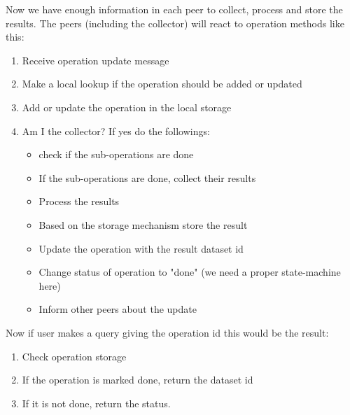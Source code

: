 Now we have enough information in each peer to collect, process and store the results. The peers (including the collector)
 will react to operation methods like this:

\begin{enumerate}
\item Receive operation update message
\item Make a local lookup if the operation should be added or updated
\item Add or update the operation in the local storage
\item Am I the collector? If yes do the followings:
\begin{itemize}
\item check if the sub-operations are done
\item If the sub-operations are done, collect their results
\item Process the results
\item Based on the storage mechanism store the result
\item Update the operation with the result dataset id
\item Change status of operation to "done" (we need a proper state-machine here)
\item Inform other peers about the update
\end{itemize}
\end{enumerate}

Now if user makes a query giving the operation id this would be the result:

\begin{enumerate}
\item Check operation storage
\item If the operation is marked done, return the dataset id
\item If it is not done, return the status.
\end{enumerate}
\fi